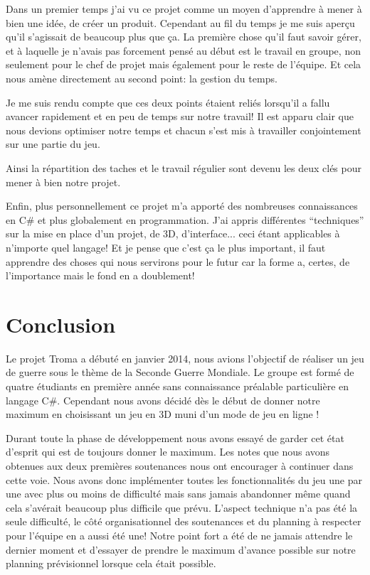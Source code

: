 \documentclass[11pt]{report}
\begin{document}
Dans un premier temps j'ai vu ce projet comme un moyen d'apprendre à mener à bien une idée, de créer un produit. Cependant au fil du temps je me suis aperçu qu'il s'agissait de beaucoup plus que ça. La première chose qu'il faut savoir gérer, et à laquelle je n'avais pas forcement pensé au début est le travail en groupe, non seulement pour le chef de projet mais également pour le reste de l'équipe. Et cela nous amène directement au second point: la gestion du temps.

Je me suis rendu compte que ces deux points étaient reliés lorsqu'il a fallu avancer rapidement et en peu de temps sur notre travail! Il est apparu clair que nous devions optimiser notre temps et chacun s'est mis à travailler conjointement sur une partie du jeu.

Ainsi la répartition des taches et le travail régulier sont devenu les deux clés pour mener à bien notre projet.

Enfin, plus personnellement ce projet m'a apporté des nombreuses connaissances en C\# et plus globalement en programmation. J'ai appris différentes ``techniques''  sur la mise en place d'un projet, de 3D, d'interface... ceci étant applicables à n'importe quel langage! Et je pense que c'est ça le plus important, il faut apprendre des choses qui nous servirons pour le futur car la forme a, certes, de l'importance mais le fond en a doublement!

\chapter*{Conclusion}

Le projet Troma a débuté en janvier 2014, nous avions l'objectif de réaliser un jeu de guerre sous le thème de la Seconde Guerre Mondiale. Le groupe est formé de quatre étudiants en première année sans connaissance préalable particulière en langage C\#. Cependant nous avons décidé dès le début de donner notre maximum en choisissant un jeu en 3D muni d'un mode de jeu en ligne ! 

Durant toute la phase de développement nous avons essayé de garder cet état d'esprit qui est de toujours donner le maximum. Les notes que nous avons obtenues aux deux premières soutenances nous ont encourager à continuer dans cette voie. Nous avons donc implémenter toutes les fonctionnalités du jeu une par une avec plus ou moins de difficulté mais sans jamais abandonner même quand cela s'avérait beaucoup plus difficile que prévu. L'aspect technique n'a pas été la seule difficulté, le côté organisationnel des soutenances et du planning à respecter pour l'équipe en a aussi été une! Notre point fort a été de ne jamais attendre le dernier moment et d'essayer de prendre le maximum d'avance possible sur notre planning prévisionnel lorsque cela était possible.
\end{document}
